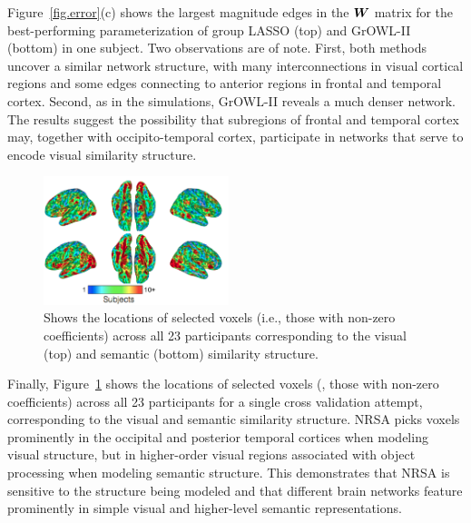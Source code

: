 Figure~\ref{fig.error}(c) shows the largest magnitude edges in the $\boldsymbol{W}$ matrix for the
best-performing parameterization of group LASSO (top) and GrOWL-II (bottom) in one
subject. Two observations are of note. First, both methods uncover a similar network
structure, with many interconnections in visual cortical regions and some edges
connecting to anterior regions in frontal and temporal cortex. Second, as in the
simulations, GrOWL-II reveals a much denser network. The results suggest the possibility
that subregions of frontal and temporal cortex may, together with occipito-temporal
cortex, participate in networks that serve to encode visual similarity structure.

\ifdefined\SEMANTIC
\begin{figure}[!h]
  \centering
    \includegraphics[width=0.48\textwidth]{figures/vissem.png}%
    \caption{Shows the locations of selected voxels (i.e., those with non-zero
      coefficients) across all 23 participants corresponding to the visual (top) and
      semantic (bottom) similarity structure. }
    \label{fig.vissem}
\end{figure}

Finally, Figure~\ref{fig.vissem} shows the locations of selected voxels (\ie, those with
non-zero coefficients) across all 23 participants for a single cross validation attempt,
corresponding to the visual and semantic similarity structure. NRSA picks voxels
prominently in the occipital and posterior temporal cortices when modeling visual
structure, but in higher-order visual regions associated with object processing when
modeling semantic structure. This demonstrates that NRSA is sensitive to the structure
being modeled and that different brain networks feature prominently in simple visual and
higher-level semantic representations.
\fi%
